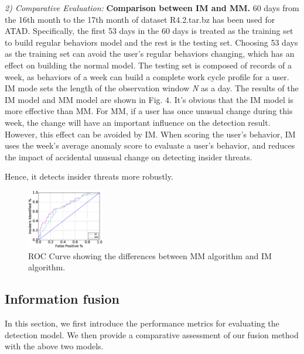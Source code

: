 \documentclass[conference]{IEEEtran}
\begin{document}

\emph{2) Comparative Evaluation:} 
\textbf{Comparison between IM and MM.}
60 days from the 16th month to the 17th month of dataset R4.2.tar.bz has been used for ATAD. Specifically, the first 53 days in the 60 days is treated as the training set to build regular behaviors model and the rest is the testing set. Choosing 53 days as the training set can avoid the user's regular behaviors changing, which has an effect on building the normal model. The testing set is composed of records of a week, as behaviors of a week can build a complete work cycle profile for a user. IM mode sets the length of the observation window \emph{N} as a day.
The results of the IM model and MM model are shown in Fig. 4. It's obvious that the IM model is more effective than MM. For MM, if a user has once unusual change during this week, the change will have an important influence on the detection result. However, this effect can be avoided by IM. When scoring the user's behavior, IM uses the week's average anomaly score to evaluate a user's behavior, and reduces the impact of accidental unusual change on detecting insider threats.

Hence, it detects insider threats more robustly. 



\begin{figure}[htb]
\centerline{\includegraphics[width = 0.30\textwidth]{figure/figure7.eps}}
\caption{ROC Curve showing the differences between MM algorithm and IM algorithm.}
\label{fig}
\end{figure}


\subsection{Information fusion}
In this section,  we first introduce the performance metrics for evaluating the detection model.
We then provide a comparative assessment of our fusion method with the above two models.
\end{document}
